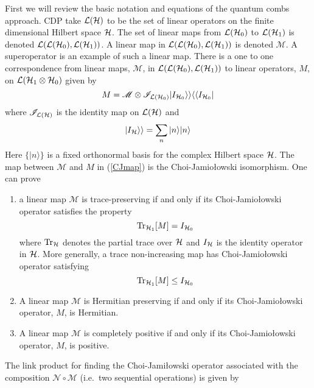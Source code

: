 \documentclass[10pt]{article}
\begin{document}
First we will review the basic notation and equations of the quantum combs approach.   CDP take ${\cal L}({\cal H})$ to be the set of linear operators on the finite dimensional Hilbert space ${\cal H}$.  The set of linear maps from ${\cal L}({\cal H}_0)$ to ${\cal L}({\cal H}_1)$ is denoted ${\cal L}({\cal L}({\cal H}_0), {\cal L}({\cal H}_1))$.   A linear map in ${\cal L}({\cal L}({\cal H}_0), {\cal L}({\cal H}_1))$ is denoted ${\mathscr M}$.  A superoperator is an example of such a linear map.   There is a one to one correspondence from linear maps, ${\mathscr M}$, in ${\cal L}({\cal L}({\cal H}_0), {\cal L}({\cal H}_1))$ to linear operators, $M$, on ${\cal L}({\cal H}_1 \otimes {\cal H}_0)$ given by
\begin{equation}\label{CJmap}
M = {\mathscr M} \otimes {\mathscr I}_{{\cal L}({\cal H}_0)} |I_{{\cal H}_0}\rangle\rangle \langle\langle I_{{\cal H}_0}|
\end{equation}
where ${\mathscr I}_{{\cal L}({\cal H})}$ is the identity map on ${\cal L}({\cal H})$ and
\begin{equation}
|I_{\cal H}\rangle\rangle = \sum_n |n\rangle|n\rangle
\end{equation}
Here $\{ |n\rangle \}$ is a fixed orthonormal basis for the complex Hilbert space ${\cal H}$.  The map between ${\mathscr M}$ and $M$ in (\ref{CJmap}) is the Choi-Jamio\l owski isomorphism.   One can prove
\begin{enumerate}
\item a linear map ${\mathscr M}$ is trace-preserving if and only if its Choi-Jamio\l owski operator  satisfies the property
\begin{equation}
\text{Tr}_{{\cal H}_1}[M] = I_{{\cal H}_0}
\end{equation}
where $\text{Tr}_{\cal H}$ denotes the partial trace over ${\cal H}$ and $I_{\cal H}$ is the identity operator in ${\cal H}$.  More generally, a trace non-increasing map has Choi-Jamio\l owski operator satisfying
\begin{equation}\label{conditiononCJ}
\text{Tr}_{{\cal H}_1}[M] \leq  I_{{\cal H}_0}
\end{equation}
\item A linear map ${\mathscr M}$ is Hermitian preserving if and only if its Choi-Jamio\l owski operator, $M$, is Hermitian.
\item A linear map ${\mathscr M}$ is completely positive if and only if its Choi-Jamio\l owski operator, $M$, is positive.
\end{enumerate}
The link product for finding the Choi-Jami\l owski operator associated with the composition ${\mathscr N}\circ{\mathscr M}$ (i.e.\ two sequential operations) is given by
\end{document}
